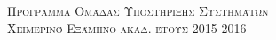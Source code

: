 \documentclass[landscape,letterpaper]{article}
\begin{document}
\pagestyle{empty} %

\noindent



\begin{center}
\textsc{\Huge Πρόγραμμα Ομάδας Υποστήριξης Συστημάτων}\\ %
\textsc{\LARGE Χειμερινό Εξάμηνο ακαδ. έτους 2015-2016}\\ %
\end{center}

\end{document}
